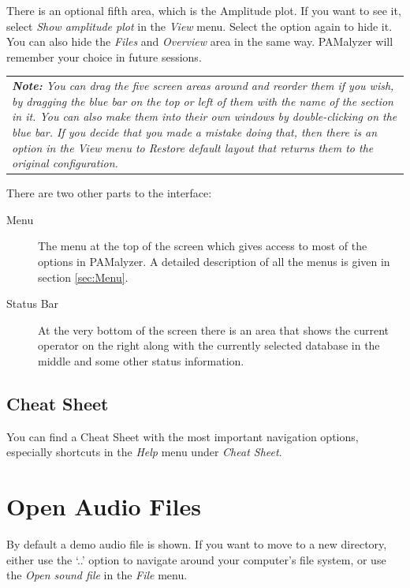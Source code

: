 \documentclass{scrartcl}
\begin{document}
There is an optional fifth area, which is the Amplitude plot.
If you want to see it, select \textit{Show amplitude plot} in the \textit{View} menu.
Select the option again to hide it.
You can also hide the \textit{Files} and \textit{Overview} area in the same way.
PAMalyzer will remember your choice in future sessions.


\begin{table}[ht!]
	\centering
	\begin{tabular}{p{}}
\textit{\textbf{Note:}
	You can drag the five screen areas around and reorder them if you wish, by dragging the blue bar on the top or left of them with the name of the section in it.
	You can also make them into their own windows by double-clicking on the blue bar.
If you decide that you made a mistake doing that, then there is an option in the \textit{View} menu to \textit{Restore default layout} that returns them to the original configuration.}
	\end{tabular}
\end{table}

There are two other parts to the interface:
	\begin{description}
	\item[Menu] The menu at the top of the screen which gives access to most of the options in PAMalyzer.
		A detailed description of all the menus is given in section \ref{sec:Menu}.
	\item[Status Bar] At the very bottom of the screen there is an area that shows the current operator on the right along with the currently selected database in the middle and some other status information.
	\end{description}



\subsection{Cheat Sheet}

You can find a Cheat Sheet with the most important navigation options, especially shortcuts in the \textit{Help} menu under \textit{Cheat Sheet}.


\section{Open Audio Files}\label{sec:OpenFiles}
By default a demo audio file is shown.
If you want to move to a new directory, either use the `..' option to navigate around your computer's file system, or use the \textit{Open sound file} in the \textit{File} menu. 
\end{document}
